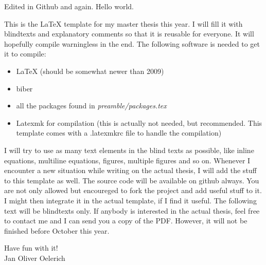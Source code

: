 \label{cha:introduction}

Edited in Github and again. Hello world.

This is the \LaTeX{} template for my master thesis this year. I will fill
it with blindtexts and explanatory comments so that it is reusable for
everyone. It will hopefully compile warningless in the end. The following
software is needed to get it to compile:
\begin{itemize}
  \item LaTeX (should be somewhat newer than 2009)
  \item biber
  \item all the packages found in \emph{preamble/packages.tex}
  \item Latexmk for compilation (this is actually not needed, but
  recommended. This template comes with a .latexmkrc file to handle the
  compilation) 
\end{itemize}
I will try to use as many text elements in the blind texts as possible,
like inline equations, multiline equations, figures, multiple figures and
so on. Whenever I encounter a new situation while writing on the actual
thesis, I will add the stuff to this template as well.
The source code will be available on github always. You are not only
allowed but encoureged to fork the project and add useful stuff to it. I
might then integrate it in the actual template, if I find it useful.
The following text will be blindtexts only. If anybody is interested in the
actual thesis, feel free to contact me and I can send you a copy of the
PDF. However, it will not be finished before October this year.

\vspace{.5cm}

Have fun with it! \\
Jan Oliver Oelerich
